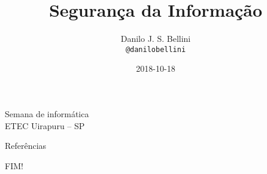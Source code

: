 \documentclass[utf8]{beamer}
\title{Segurança da Informação}
\author{Danilo J. S. Bellini \\ \texttt{@danilobellini}}
\date{2018-10-18}
\begin{document}
\begin{frame}
  \titlepage
  \center Semana de informática \\ ETEC Uirapuru -- SP
\end{frame}


\begin{frame}{Referências}
\end{frame}


\begin{frame}
  \begin{center}\fontsize{5cm}{2.5cm}\selectfont
    FIM!
  \end{center}
\end{frame}
\end{document}
